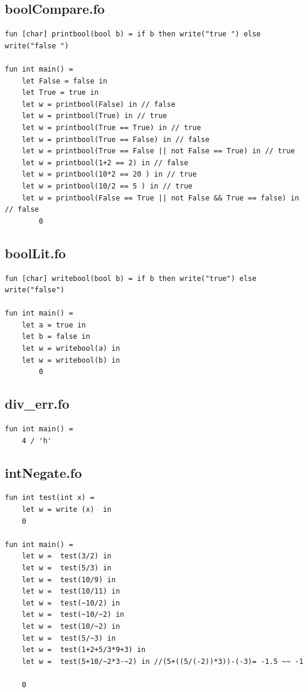 \documentclass[11pt]{article}
\begin{document}
    \subsection{boolCompare.fo}
    \begin{lstlisting}
fun [char] printbool(bool b) = if b then write("true ") else write("false ")

fun int main() =
    let False = false in
    let True = true in
    let w = printbool(False) in // false
    let w = printbool(True) in // true
    let w = printbool(True == True) in // true
    let w = printbool(True == False) in // false
    let w = printbool(True == False || not False == True) in // true
    let w = printbool(1+2 == 2) in // false
    let w = printbool(10*2 == 20 ) in // true
    let w = printbool(10/2 == 5 ) in // true
    let w = printbool(False == True || not False && True == false) in // false
        0
    \end{lstlisting}

    \subsection{boolLit.fo}
    \begin{lstlisting}
fun [char] writebool(bool b) = if b then write("true") else write("false")

fun int main() =
    let a = true in
    let b = false in
    let w = writebool(a) in
    let w = writebool(b) in
        0
    \end{lstlisting}

    \subsection{div\_err.fo}
    \begin{lstlisting}
fun int main() =
    4 / 'h'
    \end{lstlisting}

    \subsection{intNegate.fo}
    \begin{lstlisting}
fun int test(int x) =
    let w = write (x)  in
    0

fun int main() =
    let w =  test(3/2) in
    let w =  test(5/3) in
    let w =  test(10/9) in
    let w =  test(10/11) in
    let w =  test(~10/2) in
    let w =  test(~10/~2) in
    let w =  test(10/~2) in
    let w =  test(5/~3) in
    let w =  test(1+2+5/3*9+3) in
    let w =  test(5+10/~2*3-~2) in //(5+((5/(-2))*3))-(-3)= -1.5 ~~ -1

    0
    \end{lstlisting}
\end{document}

